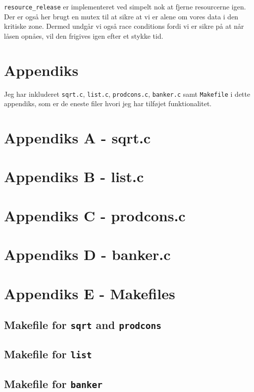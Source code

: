 \documentclass{article}
\begin{document}
\texttt{resource\_release} er implementeret ved simpelt nok at fjerne resourcerne igen. Der er også her brugt en mutex til at sikre at vi er alene om vores data i den kritiske zone. Dermed undgår vi også race conditions fordi vi er sikre på at når låsen opnåes, vil den frigives igen efter et stykke tid.

\newpage

\section*{Appendiks}
Jeg har inkluderet \texttt{sqrt.c}, \texttt{list.c}, \texttt{prodcons.c}, \texttt{banker.c} samt \texttt{Makefile} i dette appendiks, som er de eneste filer hvori jeg har tilføjet funktionalitet.

\label{sqrtcode}
\section*{Appendiks A - sqrt.c}


\newpage
\label{listcode}
\section*{Appendiks B - list.c}


\newpage
\label{prodconscode}
\section*{Appendiks C - prodcons.c}


\newpage
\label{bankercode}
\section*{Appendiks D - banker.c}


\newpage 

\section*{Appendiks E - Makefiles}
\subsection*{Makefile for \texttt{sqrt} and \texttt{prodcons}}

\subsection*{Makefile for \texttt{list}}

\subsection*{Makefile for \texttt{banker}}


\label{lastPage}
\end{document}
